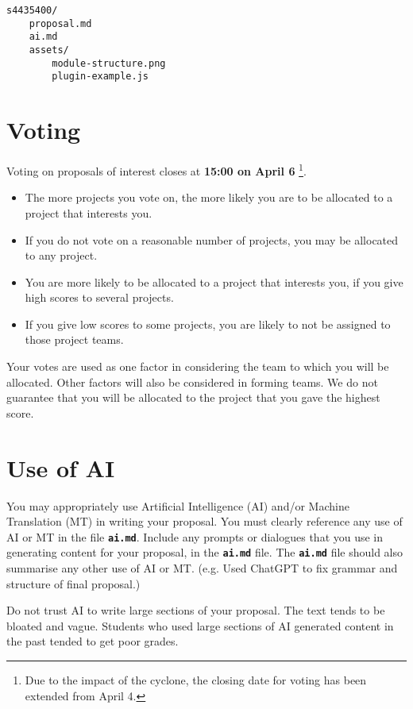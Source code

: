 \documentclass{csse4400}
\begin{document}
\begin{minipage}{\textwidth}
\begin{verbatim}
s4435400/
    proposal.md
    ai.md
    assets/
        module-structure.png
        plugin-example.js
\end{verbatim}
\end{minipage}


\section{Voting}
Voting on proposals of interest closes at \textbf{15:00 on April 6}%
\footnote{Due to the impact of the cyclone, the closing date for voting has been extended from April 4.}.

\begin{itemize}
    \item The more projects you vote on, the more likely you are to be allocated to a project that interests you.
    \item If you do not vote on a reasonable number of projects, you may be allocated to any project.
    \item You are more likely to be allocated to a project that interests you,
          if you give high scores to several projects.
    \item If you give low scores to some projects, you are likely to not be assigned to those project teams.
\end{itemize}

\noindent
Your votes are used as one factor in considering the team to which you will be allocated.
Other factors will also be considered in forming teams.
We do not guarantee that you will be allocated to the project that you gave the highest score.


\section{Use of AI}
You may appropriately use Artificial Intelligence (AI) and/or Machine Translation (MT) in writing your proposal.
You must clearly reference any use of AI or MT in the file \textbf{\texttt{ai.md}}.
Include any prompts or dialogues that you use in generating content for your proposal, in the \textbf{\texttt{ai.md}} file.
The \textbf{\texttt{ai.md}} file should also summarise any other use of AI or MT.
(e.g. Used ChatGPT to fix grammar and structure of final proposal.)

Do not trust AI to write large sections of your proposal.
The text tends to be bloated and vague.
Students who used large sections of AI generated content in the past tended to get poor grades.
\end{document}
